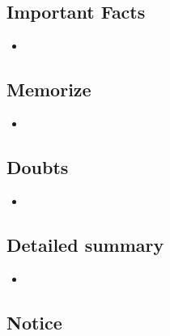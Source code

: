 \documentclass{article}
\begin{document}
\subsection{Important Facts}

    \begin{itemize}

    \item 
    
    \end{itemize}

\subsection{Memorize}

    \begin{itemize}

    \item {}
    
    \end{itemize}

\subsection{Doubts}

    \begin{itemize}

    \item 
    
    \end{itemize}

\subsection{Detailed summary}

    \begin{itemize}

    \item 
    
    \end{itemize}

\subsection{Notice}
\end{document}
